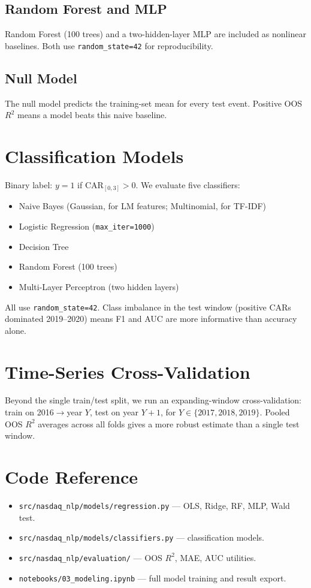 \documentclass[12pt,a4paper]{article}
\begin{document}
\subsection{Random Forest and MLP}

Random Forest (100 trees) and a two-hidden-layer MLP are included as nonlinear
baselines.  Both use \texttt{random\_state=42} for reproducibility.

\subsection{Null Model}

The null model predicts the training-set mean for every test event.
Positive OOS $R^2$ means a model beats this naive baseline.

\section{Classification Models}

Binary label: $y = 1$ if CAR$_{[0,3]} > 0$.
We evaluate five classifiers:

\begin{itemize}
  \item Naive Bayes (Gaussian, for LM features; Multinomial, for TF-IDF)
  \item Logistic Regression (\texttt{max\_iter=1000})
  \item Decision Tree
  \item Random Forest (100 trees)
  \item Multi-Layer Perceptron (two hidden layers)
\end{itemize}

All use \texttt{random\_state=42}.  Class imbalance in the test window
(positive CARs dominated 2019--2020) means F1 and AUC are more informative
than accuracy alone.

\section{Time-Series Cross-Validation}

Beyond the single train/test split, we run an expanding-window cross-validation:
train on 2016$\rightarrow$year $Y$, test on year $Y{+}1$, for $Y \in \{2017, 2018, 2019\}$.
Pooled OOS $R^2$ averages across all folds gives a more robust estimate
than a single test window.

\section{Code Reference}

\begin{itemize}
  \item \texttt{src/nasdaq\_nlp/models/regression.py} --- OLS, Ridge, RF, MLP, Wald test.
  \item \texttt{src/nasdaq\_nlp/models/classifiers.py} --- classification models.
  \item \texttt{src/nasdaq\_nlp/evaluation/} --- OOS $R^2$, MAE, AUC utilities.
  \item \texttt{notebooks/03\_modeling.ipynb} --- full model training and result export.
\end{itemize}
\end{document}
